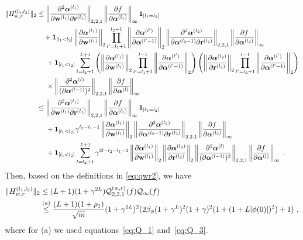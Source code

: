 \begin{align*}
\| H_{w,r}^{(l_1,l_2)} \|_2 
& \leq  \left\| \frac{\partial^2 \boldsymbol{\alpha}^{(l_1)}}{\partial \mathbf{w}^{(l_1)}  \partial \mathbf{r}^{(l_1)}} \right\|_{2,2,1} \left\| \frac{\partial f}{\partial \boldsymbol{\alpha}^{(l_1)}} \right\|_{\infty}\bm{1}_{[l_1=l_2]} \\
& ~~~ +\bm{1}_{[l_1 <l_2]}  \left\| \frac{\partial \boldsymbol{\alpha}^{(l_1)}}{\partial \mathbf{w}^{(l_1)}} \right\|_2 \prod_{l'=l_1+1}^{l_2-1} \left\| \frac{\partial \boldsymbol{\alpha}^{(l')}}{\partial \boldsymbol{\alpha}^{(l'-1)}} \right\|_2 \left\| \frac{\partial^2 \boldsymbol{\alpha}^{(l_2)}}{\partial \boldsymbol{\alpha}^{(l_2-1)} \partial \mathbf{r}^{(l_2)}} \right\|_{2,2,1} \left\| \frac{\partial f}{\partial \boldsymbol{\alpha}^{(l_2)}} \right\|_{\infty} \\
& ~~~~ + \bm{1}_{[l_1 <l_2]}\sum_{l=l_2+1}^{L+1} \left( \left\| \frac{\partial \boldsymbol{\alpha}^{(l_1)}}{\partial \mathbf{w}^{(l_1)}} \right\|_2  \prod_{l'=l_1+1}^{l-1} \left\| \frac{\partial \boldsymbol{\alpha}^{(l')}}{\partial \boldsymbol{\alpha}^{(l'-1)}} \right\|_2 \right)  \left( \left\| \frac{\partial \boldsymbol{\alpha}^{(l_2)}}{\partial \mathbf{r}^{(l_2)}} \right\|_2 \prod_{l'=l_2+1}^{l-1} \left\| \frac{\partial \boldsymbol{\alpha}^{(l')}}{\partial \boldsymbol{\alpha}^{(l'-1)}} \right\|_{2} \right)\\
& ~~~~ \times\left\| \frac{\partial^2 \boldsymbol{\alpha}^{(l)}}{(\partial \boldsymbol{\alpha}^{(l-1)})^2} \right\|_{2,2,1} \left\| \frac{\partial f}{\partial \boldsymbol{\alpha}^{(l)}} \right\|_{\infty} \\
& \leq  \left\| \frac{\partial^2 \boldsymbol{\alpha}^{(l_1)}}{\partial \mathbf{w}^{(l_1)}  \partial \mathbf{r}^{(l_1)}} \right\|_{2,2,1} \left\| \frac{\partial f}{\partial \boldsymbol{\alpha}^{(l_1)}} \right\|_{\infty} \bm{1}_{[l_1 =l_2]}\\
& ~~~~ + \bm{1}_{[l_1 <l_2]} \gamma^{l_2-l_1-1} \left\| \frac{\partial \boldsymbol{\alpha}^{(l_1)}}{\partial \mathbf{w}^{(l_1)}} \right\|_2 \left\| \frac{\partial^2 \boldsymbol{\alpha}^{(l_2)}}{\partial \boldsymbol{\alpha}^{(l_2-1)} \partial \mathbf{r}^{(l_2)}} \right\|_{2,2,1} \left\| \frac{\partial f}{\partial \boldsymbol{\alpha}^{(l_2)}} \right\|_{\infty} \\
& ~~~~ + \bm{1}_{[l_1 <l_2]}\sum_{l=l_2+1}^{L+1} \gamma^{2l - l_2 - l_1-2} \left\| \frac{\partial \boldsymbol{\alpha}^{(l_1)}}{\partial \mathbf{w}^{(l_1)}} \right\|_2  \left\| \frac{\partial \boldsymbol{\alpha}^{(l_2)}}{\partial \mathbf{r}^{(l_2)}} \right\|_2  \left\| \frac{\partial^2 \boldsymbol{\alpha}^{(l)}}{(\partial \boldsymbol{\alpha}^{(l-1)})^2} \right\|_{2,2,1} \left\| \frac{\partial f}{\partial \boldsymbol{\alpha}^{(l)}} \right\|_{\infty}~.
\end{align*}
Then, based on the definitions in \eqref{eq:qwr2}, we have
\begin{align*}
 \| H_{w,r}^{(l_1,l_2)} \|_2 &\leq (L+1)(1+\gamma^{2L}) {\cal Q}^{(w,r)}_{2,2,1}(f) {\cal Q}_{\infty}(f)\\
 &\overset{(a)}{\leq}
 \frac{(L+1)(1+\rho_1)}{\sqrt{m}}(1+\gamma^{2L})^2(2\beta_{\phi}(1+\gamma^L)^2(1+\gamma)^2(1+(1+L|\phi(0)|)^2)+1)
 ~,
\end{align*}
where for (a) we used equations~\eqref{eq:Q_1} and~\eqref{eq:Q_3}. 

